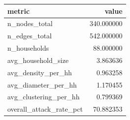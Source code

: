 \begin{tabular}{lr}
\toprule
metric & value \\
\midrule
n\_nodes\_total & 340.000000 \\
n\_edges\_total & 542.000000 \\
n\_households & 88.000000 \\
avg\_household\_size & 3.863636 \\
avg\_density\_per\_hh & 0.963258 \\
avg\_diameter\_per\_hh & 1.170455 \\
avg\_clustering\_per\_hh & 0.799369 \\
overall\_attack\_rate\_pct & 70.882353 \\
\bottomrule
\end{tabular}
